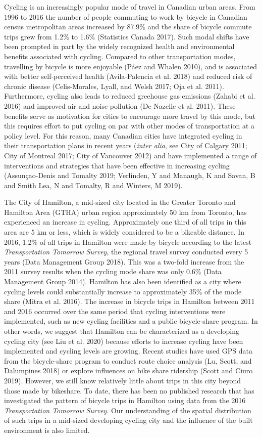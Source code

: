 \documentclass[smallextended]{svjour3}       %
\begin{document}
Cycling is an increasingly popular mode of travel in Canadian urban
areas. From 1996 to 2016 the number of people commuting to work by
bicycle in Canadian census metropolitan areas increased by 87.9\% and
the share of bicycle commute trips grew from 1.2\% to 1.6\% (Statistics
Canada 2017). Such modal shifts have been prompted in part by the widely
recognized health and environmental benefits associated with cycling.
Compared to other transportation modes, travelling by bicycle is more
enjoyable (Páez and Whalen 2010), and is associated with better
self-perceived health (Avila-Palencia et al. 2018) and reduced risk of
chronic disease (Celis-Morales, Lyall, and Welsh 2017; Oja et al. 2011).
Furthermore, cycling also leads to reduced greehouse gas emissions
(Zahabi et al. 2016) and improved air and noise pollution (De Nazelle et
al. 2011). These benefits serve as motivation for cities to encourage
more travel by this mode, but this requires effort to put cycling on par
with other modes of transportation at a policy level. For this reason,
many Canadian cities have integrated cycling in their transportation
plans in recent years (\emph{inter alia}, see City of Calgary 2011; City
of Montreal 2017; City of Vancouver 2012) and have implemented a range
of interventions and strategies that have been effective in increasing
cycling (Assunçao-Denis and Tomalty 2019; Verlinden, Y and Manaugh, K
and Savan, B and Smith Lea, N and Tomalty, R and Winters, M 2019).

The City of Hamilton, a mid-sized city located in the Greater Toronto
and Hamilton Area (GTHA) urban region approximately 50 km from Toronto,
has experienced an increase in cycling. Approximately one third of all
trips in this area are 5 km or less, which is widely considered to be a
bikeable distance. In 2016, 1.2\% of all trips in Hamilton were made by
bicycle according to the latest \emph{Transportation Tomorrow Survey},
the regional travel survey conducted every 5 years (Data Management
Group 2018). This was a two-fold increase from the 2011 survey results
when the cycling mode share was only 0.6\% (Data Management Group 2014).
Hamilton has also been identified as a city where cycling levels could
substantially increase to approximately 35\% of the mode share (Mitra et
al. 2016). The increase in bicycle trips in Hamilton between 2011 and
2016 occurred over the same period that cycling interventions were
implemented, such as new cycling facilities and a public bicycle-share
program. In other words, we suggest that Hamilton can be characterized
as a developing cycling city (see Liu et al. 2020) because efforts to
increase cycling have been implemented and cycling levels are growing.
Recent studies have used GPS data from the bicycle-share program to
conduct route choice analysis (Lu, Scott, and Dalumpines 2018) or
explore influences on bike share ridership (Scott and Ciuro 2019).
However, we still know relatively little about trips in this city beyond
those made by bikeshare. To date, there has been no published research
that has investigated the pattern of bicycle trips in Hamilton using
data from the 2016 \emph{Transportation Tomorrow Survey}. Our
understanding of the spatial distribution of such trips in a mid-sized
developing cycling city and the influence of the built environment is
also limited.
\end{document}
